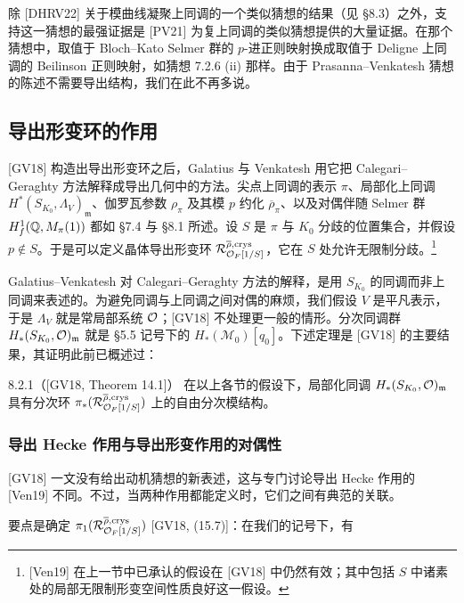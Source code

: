 除 [DHRV22] 关于模曲线凝聚上同调的一个类似猜想的结果（见 §8.3）之外，支持这一猜想的最强证据是 [PV21] 为复上同调的类似猜想提供的大量证据。在那个猜想中，取值于 Bloch--Kato Selmer 群的 $p$-进正则映射换成取值于 Deligne 上同调的 Beilinson 正则映射，如猜想 7.2.6 (ii) 那样。由于 Prasanna--Venkatesh 猜想的陈述不需要导出结构，我们在此不再多说。

\subsection{导出形变环的作用}

[GV18] 构造出导出形变环之后，Galatius 与 Venkatesh 用它把 Calegari--Geraghty 方法解释成导出几何中的方法。尖点上同调的表示 $\pi$、局部化上同调 $H^*(S_{K_0},\Lambda_V)_{\mathfrak m}$、伽罗瓦参数 $\rho_\pi$ 及其模 $p$ 约化 $\overline{\rho}_\pi$、以及对偶伴随 Selmer 群 $H^1_f(\mathbb{Q},M_\pi(1))$ 都如 §7.4 与 §8.1 所述。设 $S$ 是 $\pi$ 与 $K_0$ 分歧的位置集合，并假设 $p\notin S$。于是可以定义晶体导出形变环 $\mathcal R^{\overline{\rho},\mathrm{crys}}_{\mathcal{O}_F[1/S]}$，它在 $S$ 处允许无限制分歧。\footnote{[Ven19] 在上一节中已承认的假设在 [GV18] 中仍然有效；其中包括 $S$ 中诸素处的局部无限制形变空间性质良好这一假设。}

Galatius--Venkatesh 对 Calegari--Geraghty 方法的解释，是用 $S_{K_0}$ 的同调而非上同调来表述的。为避免同调与上同调之间对偶的麻烦，我们假设 $V$ 是平凡表示，于是 $\Lambda_V$ 就是常局部系统 $\mathcal{O}$；[GV18] 不处理更一般的情形。分次同调群 $H_*(S_{K_0},\mathcal{O})_{\mathfrak m}$ 就是 §5.5 记号下的 $H_*(\mathcal M_0)[q_0]$。下述定理是 [GV18] 的主要结果，其证明此前已概述过：

\begin{thm}{8.2.1}（[GV18, Theorem 14.1]）\label{thm:a6-05-12}
在以上各节的假设下，局部化同调 $H_*(S_{K_0},\mathcal{O})_{\mathfrak m}$ 具有分次环 $\pi_*(\mathcal R^{\overline{\rho},\mathrm{crys}}_{\mathcal{O}_F[1/S]})$ 上的自由分次模结构。
\end{thm}

\subsubsection{导出 Hecke 作用与导出形变作用的对偶性}

[GV18] 一文没有给出动机猜想的新表述，这与专门讨论导出 Hecke 作用的 [Ven19] 不同。不过，当两种作用都能定义时，它们之间有典范的关联。

要点是确定 $\pi_1(\mathcal R^{\overline{\rho},\mathrm{crys}}_{\mathcal{O}_F[1/S]})$ [GV18, (15.7)]：在我们的记号下，有


